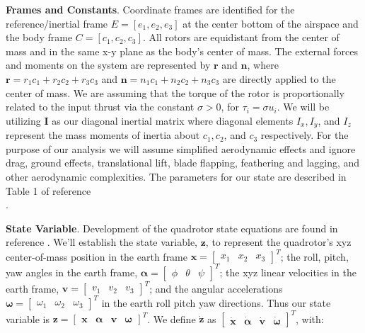 \documentclass{article}
\begin{document}
\begin{multicols}{2}
\noindent \textbf{Frames and Constants}.  Coordinate frames are identified for the reference/inertial frame $E={[e_1, e_2, e_3]}$ at the center bottom of the airspace and the body frame $C={[c_1, c_2, c_3]}$. All rotors are equidistant from the center of mass and in the same x-y plane as the body's center of mass. The external forces and moments on the system are represented by $\boldsymbol{r}$ and $\boldsymbol{n}$, where $\boldsymbol{r} = r_1 c_1 + r_2 c_2 + r_3 c_3$ and $\boldsymbol{n} = n_1 c_1 + n_2 c_2 + n_3 c_3$ are directly applied to the center of mass. We are assuming that the torque of the rotor is proportionally related to the input thrust via the constant $\sigma>0$, for $\tau_i = \sigma u_i$. We will be utilizing $\boldsymbol{I}$ as our diagonal inertial matrix where diagonal elements  $I_x, I_y $, and $I_z$ represent the mass moments of inertia about $c_1, c_2 $, and $c_3$ respectively. For the purpose of our analysis we will assume simplified aerodynamic effects and ignore  drag, ground effects, translational lift, blade flapping, feathering and lagging, and other aerodynamic complexities. The parameters for our state are described in Table 1 of reference \cite{FaalP}\\.

\noindent \textbf{State Variable}.  Development of the quadrotor state equations are found in reference \cite{FaalD}.  We'll establish the state variable, $\mathbf{z}$, to represent the quadrotor's xyz center-of-mass position in the earth frame $\mathbf{x}=\begin{bmatrix}x_1 & x_2 & x_3\end{bmatrix}^T$; the roll, pitch, yaw angles in the earth frame, $\bm{\alpha} =\begin{bmatrix}\phi & \theta & \psi\end{bmatrix}^T$; the xyz linear velocities in the earth frame, $\mathbf{v}=\begin{bmatrix}v_1 & v_2 & v_3\end{bmatrix}^T$; and the angular accelerations $\bm{\omega}=\begin{bmatrix}\omega_1 & \omega_2 & \omega_3\end{bmatrix}^T$ in the earth roll pitch yaw directions. Thus our state variable is $\mathbf{z}=\begin{bmatrix}\mathbf{x} &\bm{\alpha}&\mathbf{v}&\bm{\omega}\end{bmatrix}^T$. We define $\boldsymbol{\dot{z}}$ as $\begin{bmatrix} \mathbf{\dot{x}} &\bm{\dot{\alpha}}&\mathbf{\dot{v}}&\bm{\dot{\omega}} \end{bmatrix}^T$, with:


\end{multicols}
\end{document}
